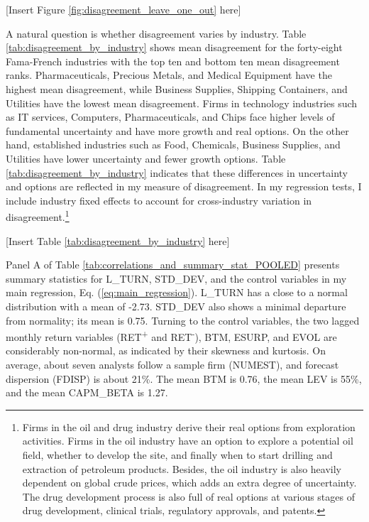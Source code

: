 \documentclass[
  12pt,
  a4paper,
  twoside,
  onecolumn]{article}
\begin{document}
\begin{center} { [Insert Figure \ref{fig:disagreement_leave_one_out} here] } \end{center}

A natural question is whether disagreement varies by industry. Table
\ref{tab:disagreement_by_industry} shows mean disagreement for the
forty-eight Fama-French industries with the top ten and bottom ten mean
disagreement ranks. Pharmaceuticals, Precious Metals, and Medical
Equipment have the highest mean disagreement, while Business Supplies,
Shipping Containers, and Utilities have the lowest mean disagreement.
Firms in technology industries such as IT services, Computers,
Pharmaceuticals, and Chips face higher levels of fundamental uncertainty
and have more growth and real options. On the other hand, established
industries such as Food, Chemicals, Business Supplies, and Utilities
have lower uncertainty and fewer growth options. Table
\ref{tab:disagreement_by_industry} indicates that these differences in
uncertainty and options are reflected in my measure of disagreement. In
my regression tests, I include industry fixed effects to account for
cross-industry variation in disagreement.\footnote{Firms in the oil and
  drug industry derive their real options from exploration activities.
  Firms in the oil industry have an option to explore a potential oil
  field, whether to develop the site, and finally when to start drilling
  and extraction of petroleum products. Besides, the oil industry is
  also heavily dependent on global crude prices, which adds an extra
  degree of uncertainty. The drug development process is also full of
  real options at various stages of drug development, clinical trials,
  regulatory approvals, and patents.}

\begin{center} { [Insert Table \ref{tab:disagreement_by_industry} here] } \end{center}

Panel A of Table \ref{tab:correlations_and_summary_stat_POOLED} presents
summary statistics for L\_TURN, STD\_DEV, and the control variables in
my main regression, Eq. (\ref{eq:main_regression}). L\_TURN has a close
to a normal distribution with a mean of -2.73. STD\_DEV also shows a
minimal departure from normality; its mean is 0.75. Turning to the
control variables, the two lagged monthly return variables
(RET\textsuperscript{+} and RET\textsuperscript{-}), BTM, ESURP, and
EVOL are considerably non-normal, as indicated by their skewness and
kurtosis. On average, about seven analysts follow a sample firm
(NUMEST), and forecast dispersion (FDISP) is about 21\%. The mean BTM is
0.76, the mean LEV is 55\%, and the mean CAPM\_BETA is 1.27.
\end{document}
